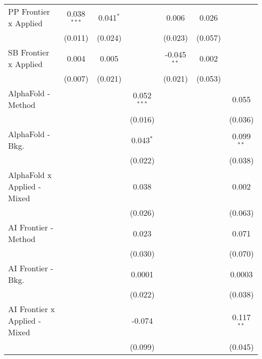\begin{tabular}{lcccccc}
   PP Frontier x Applied          & 0.038$^{***}$ & 0.041$^{*}$   &               & 0.006         & 0.026         &   \\   
                                  & (0.011)       & (0.024)       &               & (0.023)       & (0.057)       &   \\   
   SB Frontier x Applied          & 0.004         & 0.005         &               & -0.045$^{**}$ & 0.002         &   \\   
                                  & (0.007)       & (0.021)       &               & (0.021)       & (0.053)       &   \\   
   AlphaFold - Method             &               &               & 0.052$^{***}$ &               &               & 0.055\\   
                                  &               &               & (0.016)       &               &               & (0.036)\\   
   AlphaFold - Bkg.               &               &               & 0.043$^{*}$   &               &               & 0.099$^{**}$\\   
                                  &               &               & (0.022)       &               &               & (0.038)\\   
   AlphaFold x Applied - Mixed    &               &               & 0.038         &               &               & 0.002\\   
                                  &               &               & (0.026)       &               &               & (0.063)\\   
   AI Frontier - Method           &               &               & 0.023         &               &               & 0.071\\   
                                  &               &               & (0.030)       &               &               & (0.070)\\   
   AI Frontier - Bkg.             &               &               & 0.0001        &               &               & 0.0003\\   
                                  &               &               & (0.022)       &               &               & (0.038)\\   
   AI Frontier x Applied - Mixed  &               &               & -0.074        &               &               & 0.117$^{**}$\\   
                                  &               &               & (0.099)       &               &               & (0.045)\\   

\end{tabular}
